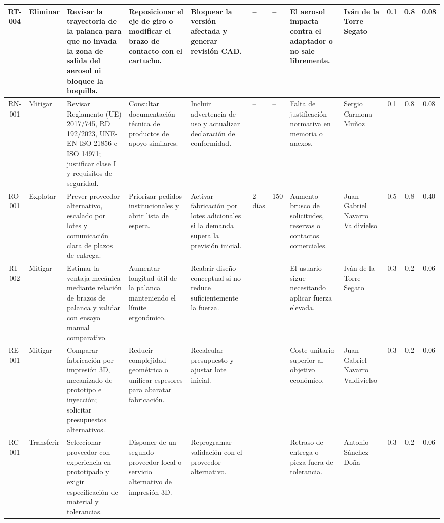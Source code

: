 \documentclass[11pt,a4paper]{article}
\begin{document}
\begin{table}[H]
{\begin{tabular}{|c|p{2.1cm}|p{4.2cm}|p{3.2cm}|p{3.3cm}|p{1.1cm}|p{1.1cm}|p{2.6cm}|p{2.8cm}|c|c|c|}
\hline
RT-004 & Eliminar & Revisar la trayectoria de la palanca para que no invada la zona de salida del aerosol ni bloquee la boquilla. & Reposicionar el eje de giro o modificar el brazo de contacto con el cartucho. & Bloquear la versión afectada y generar revisión CAD. & -- & -- & El aerosol impacta contra el adaptador o no sale libremente. & Iván de la Torre Segato & 0.1 & 0.8 & \cellcolor{yellow!55}0.08 \\
\hline
RN-001 & Mitigar & Revisar Reglamento (UE) 2017/745, RD 192/2023, UNE-EN ISO 21856 e ISO 14971; justificar clase I y requisitos de seguridad. & Consultar documentación técnica de productos de apoyo similares. & Incluir advertencia de uso y actualizar declaración de conformidad. & -- & -- & Falta de justificación normativa en memoria o anexos. & Sergio Carmona Muñoz & 0.1 & 0.8 & \cellcolor{yellow!55}0.08 \\
\hline
RO-001 & Explotar & Prever proveedor alternativo, escalado por lotes y comunicación clara de plazos de entrega. & Priorizar pedidos institucionales y abrir lista de espera. & Activar fabricación por lotes adicionales si la demanda supera la previsión inicial. & 2 días & 150 & Aumento brusco de solicitudes, reservas o contactos comerciales. & Juan Gabriel Navarro Valdivielso & 0.5 & 0.8 & \cellcolor{ArthroTeal!35}0.40 \\
\hline
RT-002 & Mitigar & Estimar la ventaja mecánica mediante relación de brazos de palanca y validar con ensayo manual comparativo. & Aumentar longitud útil de la palanca manteniendo el límite ergonómico. & Reabrir diseño conceptual si no reduce suficientemente la fuerza. & -- & -- & El usuario sigue necesitando aplicar fuerza elevada. & Iván de la Torre Segato & 0.3 & 0.2 & \cellcolor{yellow!55}0.06 \\
\hline
RE-001 & Mitigar & Comparar fabricación por impresión 3D, mecanizado de prototipo e inyección; solicitar presupuestos alternativos. & Reducir complejidad geométrica o unificar espesores para abaratar fabricación. & Recalcular presupuesto y ajustar lote inicial. & -- & -- & Coste unitario superior al objetivo económico. & Juan Gabriel Navarro Valdivielso & 0.3 & 0.2 & \cellcolor{yellow!55}0.06 \\
\hline
RC-001 & Transferir & Seleccionar proveedor con experiencia en prototipado y exigir especificación de material y tolerancias. & Disponer de un segundo proveedor local o servicio alternativo de impresión 3D. & Reprogramar validación con el proveedor alternativo. & -- & -- & Retraso de entrega o pieza fuera de tolerancia. & Antonio Sánchez Doña & 0.3 & 0.2 & \cellcolor{yellow!55}0.06 \\

\end{tabular}}
\end{table}
\end{document}
